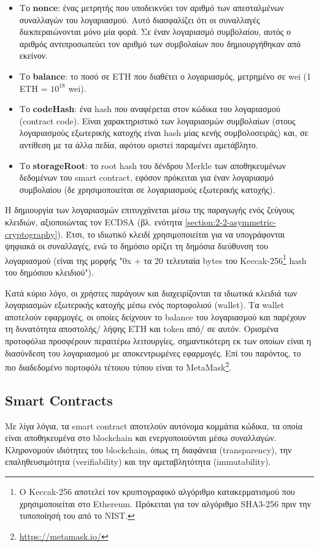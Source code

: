 \begin{itemize}
	\item Το \textbf{nonce}: ένας μετρητής που υποδεικνύει τον αριθμό των απεσταλμένων συναλλαγών του λογαριασμού. Αυτό διασφαλίζει ότι οι συναλλαγές διεκπεραιώνονται μόνο μία φορά. Σε έναν λογαριασμό συμβολαίου, αυτός ο αριθμός αντιπροσωπεύει τον αριθμό των συμβολαίων που δημιουργήθηκαν από εκείνον.

	\item Το \textbf{balance}: το ποσό σε ETH που διαθέτει ο λογαριασμός, μετρημένο σε wei (1 ETH = $10^{18}$ wei).

	\item Το \textbf{codeHash}: ένα hash που αναφέρεται στον κώδικα του λογαριασμού (contract code). Είναι χαρακτηριστικό των λογαριασμών συμβολαίων (στους λογαριασμούς εξωτερικής κατοχής είναι hash μίας κενής συμβολοσειράς) και, σε αντίθεση με τα άλλα πεδία, αφότου οριστεί παραμένει αμετάβλητο.

	\item Το \textbf{storageRoot}: το root hash του δένδρου Merkle των αποθηκευμένων δεδομένων του smart contract, εφόσον πρόκειται για έναν λογαριασμό συμβολαίου (δε χρησιμοποιείται σε λογαριασμούς εξωτερικής κατοχής).
\end{itemize}

Η δημιουργία των λογαριασμών επιτυγχάνεται μέσω της παραγωγής ενός ζεύγους κλειδιών, αξιοποιώντας τον 
ECDSA (βλ. ενότητα \ref{section:2-2-asymmetric-cryptography}). Έτσι, το ιδιωτικό κλειδί χρησιμοποιείται για να υπογράφονται ψηφιακά οι συναλλαγές, ενώ το δημόσιο ορίζει τη δημόσια διεύθυνση του λογαριασμού (είναι της μορφής "0x + τα 20 τελευταία bytes του Keccak-256\footnote{Ο Keccak-256 αποτελεί τον κρυπτογραφικό αλγόριθμο κατακερματισμού που χρησιμοποιείται στο Ethereum. Πρόκειται για τον αλγόριθμο SHA3-256 πριν την τυποποίησή του από το NIST.} hash του δημόσιου κλειδιού").

Κατά κύριο λόγο, οι χρήστες παράγουν και διαχειρίζονται τα ιδιωτικά κλειδιά των λογαριασμών εξωτερικής κατοχής μέσω ενός πορτοφολιού (wallet). Τα wallet αποτελούν εφαρμογές, οι οποίες δείχνουν το balance του λογαριασμού και παρέχουν τη δυνατότητα αποστολής/ λήψης ETH και token από/ σε αυτόν. Ορισμένα προτοφόλια προσφέρουν περαιτέρω λειτουργίες, σημαντικότερη εκ των οποίων είναι η διασύνδεση του λογαριασμού με αποκεντρωμένες εφαρμογές. Επί του παρόντος, το πιο διαδεδομένο πορτοφόλι τέτοιου τύπου είναι το MetaMask\footnote{\url{https://metamask.io/}}.

\subsection{Smart Contracts}
Με λίγα λόγια, τα smart contract αποτελούν αυτόνομα κομμάτια κώδικα, τα οποία είναι αποθηκευμένα στο blockchain και ενεργοποιούνται μέσω συναλλαγών. Κληρονομούν ιδιότητες του blockchain, όπως τη διαφάνεια (transparency), την επαληθευσιμότητα (verifiability) και την αμεταβλητότητα (immutability).

